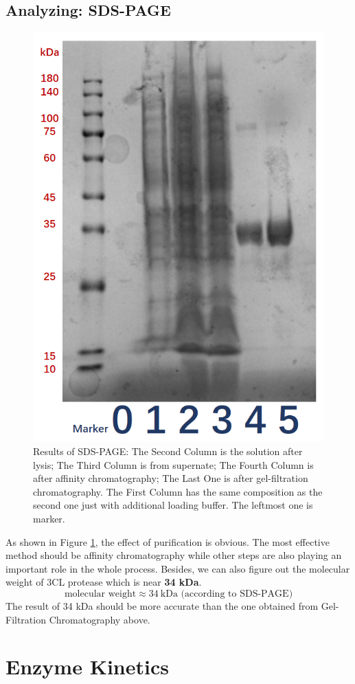 \documentclass{report}
\begin{document}
\subsection{Analyzing: SDS-PAGE}
\begin{figure}
    \centering
    \includegraphics[width=0.7\linewidth]{../Figures/SDS-PAGE.png}
    \caption{Results of SDS-PAGE: The Second Column is the solution after lysis; The Third Column is from supernate; The Fourth Column is after affinity chromatography; The Last One is after gel-filtration chromatography. The First Column has the same composition as the second one just with additional loading buffer. The leftmost one is marker.}
    \label{Results of SDS-PAGE}
\end{figure}
As shown in Figure \ref{Results of SDS-PAGE}, the effect of purification is obvious.
The most effective method should be affinity chromatography while other steps are also playing an important role in the whole process.
Besides, we can also figure out the molecular weight of 3CL protease which is near \textbf{34 kDa}.
$$
\text{molecular weight}\approx 34 \ \text{kDa (according to SDS-PAGE)}
$$
The result of 34 kDa should be more accurate than the one obtained from Gel-Filtration Chromatography above.
\section{Enzyme Kinetics}
\end{document}
